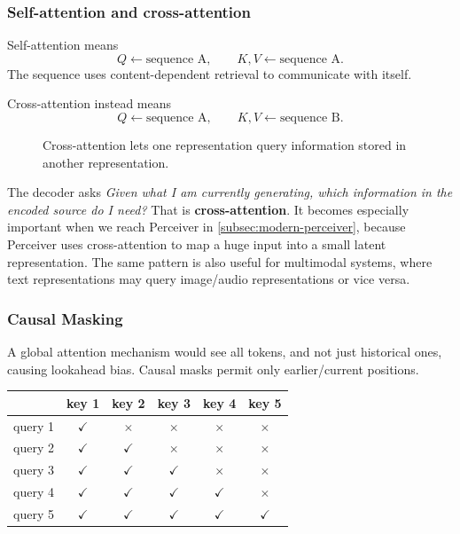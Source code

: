 \subsubsection{Self-attention and cross-attention}
\label{subsec:modern-cross-attention}
Self-attention means
\[
Q\leftarrow\text{sequence A},
\qquad
K,V\leftarrow\text{sequence A}.
\]
The sequence uses content-dependent retrieval to communicate with itself.

Cross-attention instead means
\[
Q\leftarrow\text{sequence A},
\qquad
K,V\leftarrow\text{sequence B}.
\]

\begin{figure}[htbp]
\centering
{}
\caption{Cross-attention lets one representation query information stored in another representation.}
\label{fig:modern-cross-attention}
\end{figure}

The decoder asks \textit{Given what I am currently generating, which information in the encoded source do I need?}
That is \textbf{cross-attention}.
It becomes especially important when we reach Perceiver in \cref{subsec:modern-perceiver}, because Perceiver uses cross-attention to map a huge input into a small latent representation.
The same pattern is also useful for multimodal systems, where text representations may query image/audio representations or vice versa.

\subsubsection{Causal Masking}
\label{sec:transformers-causal-mask}
A global attention mechanism would see all tokens, and not just historical ones, causing lookahead bias.
Causal masks permit only earlier/current positions.

\begin{center}
\small
\begin{tabular}{c|ccccc}
 & key 1 & key 2 & key 3 & key 4 & key 5\\
\hline
query 1 & $\checkmark$ & $\times$ & $\times$ & $\times$ & $\times$\\
query 2 & $\checkmark$ & $\checkmark$ & $\times$ & $\times$ & $\times$\\
query 3 & $\checkmark$ & $\checkmark$ & $\checkmark$ & $\times$ & $\times$\\
query 4 & $\checkmark$ & $\checkmark$ & $\checkmark$ & $\checkmark$ & $\times$\\
query 5 & $\checkmark$ & $\checkmark$ & $\checkmark$ & $\checkmark$ & $\checkmark$\\
\end{tabular}
\end{center}

